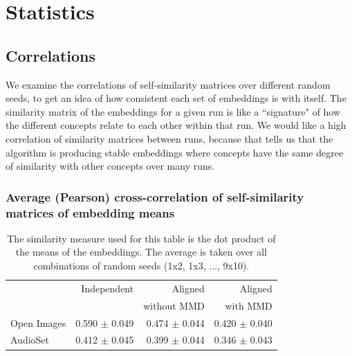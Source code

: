 \section{Statistics}

\subsection{Correlations}

We examine the correlations of self-similarity matrices over different random seeds, to get an idea of how consistent each set of embeddings is with itself. The similarity matrix of the embeddings for a given run is like a ``signature" of how the different concepts relate to each other within that run. We would like a high correlation of similarity matrices between runs, because that tells us that the algorithm is producing stable embeddings where concepts have the same degree of similarity with other concepts over many runs. 

\subsubsection{Average (Pearson) cross-correlation of self-similarity matrices of embedding means}

\begin{table}[H]
\centering
\begin{tabular}{lrrr}
\toprule
       &   Independent & Aligned     &  Aligned  \\
       &               & without MMD &  with MMD \\
\midrule
Open Images    & 0.590 $\pm$ 0.049 & 0.474 $\pm$ 0.044 &     0.420 $\pm$  0.040 \\
AudioSet    & 0.412 $\pm$ 0.045 &  0.399 $\pm$ 0.044  &      0.346  $\pm$ 0.043  \\
\bottomrule
\end{tabular}
\caption{\label{table:corrmeans}The similarity measure used for this table is the dot product of the means of the embeddings. The average is taken over all combinations of random seeds (1x2, 1x3, ..., 9x10).}
\end{table}

